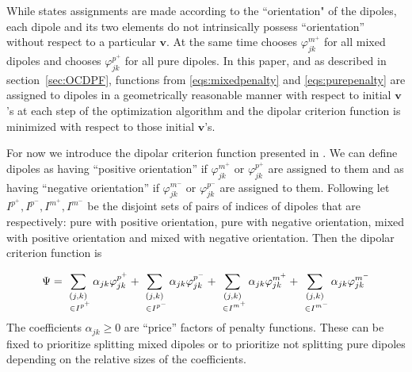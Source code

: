 \documentclass[sn-mathphys]{sn-jnl}%
\theoremstyle{thmstyleone}%
\theoremstyle{thmstyletwo}%
\theoremstyle{thmstylethree}%
\begin{document}
While \cite{kretowska} states assignments are made according to the ``orientation" of the dipoles, each dipole and its two elements do not intrinsically possess ``orientation'' without respect to a particular $\mathbf{v}$.   At the same time \cite{bobrowskikretowski} chooses $\varphi^{m^+}_{jk}$ for all mixed dipoles and chooses $\varphi^{p^+}_{jk}$ for all pure dipoles. In this paper, and as described in section~\ref{sec:OCDPF},  functions from \eqref{eqs:mixedpenalty} and \eqref{eqs:purepenalty} are assigned to dipoles in a geometrically reasonable manner with respect to initial $\mathbf{v}$'s at each step of the optimization algorithm and the dipolar criterion function is minimized with respect to those initial $\mathbf{v}$'s.

For now we introduce the dipolar criterion function presented in \cite{kretowska}. We can define dipoles as having ``positive orientation'' if  $\varphi^{m^+}_{jk}$ or $\varphi^{p^+}_{jk}$ are assigned to them and as having ``negative orientation'' if $\varphi^{m^-}_{jk}$ or $\varphi^{p^-}_{jk}$ are assigned to them. Following \cite{kretowska} let $I^{p^+}, I^{p^-}, I^{m^+}, I^{m^-}$ be the disjoint sets of pairs of indices of dipoles that are respectively: pure with positive orientation, pure with negative orientation, mixed with positive orientation and mixed with negative orientation. Then the dipolar criterion function is

\begin{align}
	\Psi = \sum_{\substack{(j, k) \\ \hspace{3.7pt} \in  I^{p^+}}} \alpha_{jk} \varphi^{p^+}_{jk} + \sum_{\substack{(j, k) \\ \hspace{3.7pt} \in I^{p^-}}} \alpha_{jk} \varphi^{p^-}_{jk} +\sum_{\substack{(j, k) \\ \hspace{3.7pt} \in I^{m^+}}} \alpha_{jk} \varphi^{m^+}_{jk} +\sum_{\substack{(j, k) \\ \hspace{3.7pt} \in I^{m^-}}} \alpha_{jk} \varphi^{m^-}_{jk} \label{eq:DPC_KRETOWSKA}
\end{align} The coefficients $\alpha_{jk} \geq 0$ are ``price'' factors of penalty functions. These can be fixed to prioritize splitting mixed dipoles or to prioritize not splitting pure dipoles depending on the relative sizes of the coefficients.

\end{document}
